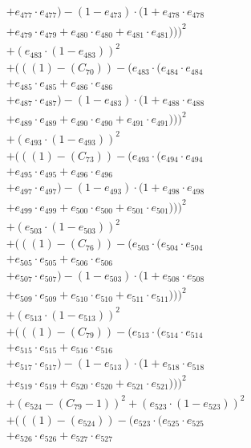 \documentclass[10pt, a4paper]{article}
\begin{document}
\begin{align*}
& + e_{477} \cdot e_{477}) - (1 - e_{473}) \cdot (1 + e_{478} \cdot e_{478} \\
& + e_{479} \cdot e_{479} + e_{480} \cdot e_{480} + e_{481} \cdot e_{481})))^{2} \\
& + (e_{483} \cdot (1 - e_{483}))^{2} \\
& + (((1) - (C_{70})) - (e_{483} \cdot (e_{484} \cdot e_{484} \\
& + e_{485} \cdot e_{485} + e_{486} \cdot e_{486} \\
& + e_{487} \cdot e_{487}) - (1 - e_{483}) \cdot (1 + e_{488} \cdot e_{488} \\
& + e_{489} \cdot e_{489} + e_{490} \cdot e_{490} + e_{491} \cdot e_{491})))^{2} \\
& + (e_{493} \cdot (1 - e_{493}))^{2} \\
& + (((1) - (C_{73})) - (e_{493} \cdot (e_{494} \cdot e_{494} \\
& + e_{495} \cdot e_{495} + e_{496} \cdot e_{496} \\
& + e_{497} \cdot e_{497}) - (1 - e_{493}) \cdot (1 + e_{498} \cdot e_{498} \\
& + e_{499} \cdot e_{499} + e_{500} \cdot e_{500} + e_{501} \cdot e_{501})))^{2} \\
& + (e_{503} \cdot (1 - e_{503}))^{2} \\
& + (((1) - (C_{76})) - (e_{503} \cdot (e_{504} \cdot e_{504} \\
& + e_{505} \cdot e_{505} + e_{506} \cdot e_{506} \\
& + e_{507} \cdot e_{507}) - (1 - e_{503}) \cdot (1 + e_{508} \cdot e_{508} \\
& + e_{509} \cdot e_{509} + e_{510} \cdot e_{510} + e_{511} \cdot e_{511})))^{2} \\
& + (e_{513} \cdot (1 - e_{513}))^{2} \\
& + (((1) - (C_{79})) - (e_{513} \cdot (e_{514} \cdot e_{514} \\
& + e_{515} \cdot e_{515} + e_{516} \cdot e_{516} \\
& + e_{517} \cdot e_{517}) - (1 - e_{513}) \cdot (1 + e_{518} \cdot e_{518} \\
& + e_{519} \cdot e_{519} + e_{520} \cdot e_{520} + e_{521} \cdot e_{521})))^{2} \\
& + (e_{524} - (C_{79} - 1))^{2} + (e_{523} \cdot (1 - e_{523}))^{2} \\
& + (((1) - (e_{524})) - (e_{523} \cdot (e_{525} \cdot e_{525} \\
& + e_{526} \cdot e_{526} + e_{527} \cdot e_{527} \\

\end{align*}
\end{document}
